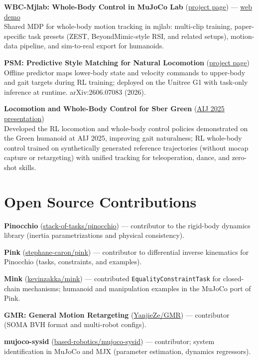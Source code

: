 \documentclass[11pt,a4paper]{article}
\begin{document}
\textbf{WBC-Mjlab: Whole-Body Control in MuJoCo Lab} (\href{https://wbc-mjlab.github.io/}{project page}) — \href{https://wbc-mjlab.github.io/wbc-demo/}{web demo}\\
Shared MDP for whole-body motion tracking in mjlab: multi-clip training, paper-specific task presets (ZEST, BeyondMimic-style RSI, and related setups), motion-data pipeline, and sim-to-real export for humanoids.

\textbf{PSM: Predictive Style Matching for Natural Locomotion} (\href{https://simeon-ned.github.io/predictive-style-matching/}{project page})\\
Offline predictor maps lower-body state and velocity commands to upper-body and gait targets during RL training; deployed on the Unitree G1 with task-only inference at runtime. arXiv:2606.07083 (2026).

\textbf{Locomotion and Whole-Body Control for Sber Green} (\href{https://youtu.be/eehll8Uw3pw?t=1432}{AIJ 2025 presentation})\\
Developed the RL locomotion and whole-body control policies demonstrated on the Green humanoid at AIJ 2025, improving gait naturalness; RL whole-body control trained on synthetically generated reference trajectories (without mocap capture or retargeting) with unified tracking for teleoperation, dance, and zero-shot skills.

\section{Open Source Contributions}

\textbf{Pinocchio} (\href{https://github.com/stack-of-tasks/pinocchio}{stack-of-tasks/pinocchio}) — contributor to the rigid-body dynamics library (inertia parametrizations and physical consistency).

\textbf{Pink} (\href{https://github.com/stephane-caron/pink}{stephane-caron/pink}) — contributor to differential inverse kinematics for Pinocchio (tasks, constraints, and examples).

\textbf{Mink} (\href{https://github.com/kevinzakka/mink}{kevinzakka/mink}) — contributed \texttt{EqualityConstraintTask} for closed-chain mechanisms; humanoid and manipulation examples in the MuJoCo port of Pink.

\textbf{GMR: General Motion Retargeting} (\href{https://github.com/YanjieZe/GMR}{YanjieZe/GMR}) — contributor (SOMA BVH format and multi-robot configs).

\textbf{mujoco-sysid} (\href{https://github.com/based-robotics/mujoco-sysid}{based-robotics/mujoco-sysid}) — contributor; system identification in MuJoCo and MJX (parameter estimation, dynamics regressors).
\end{document}
